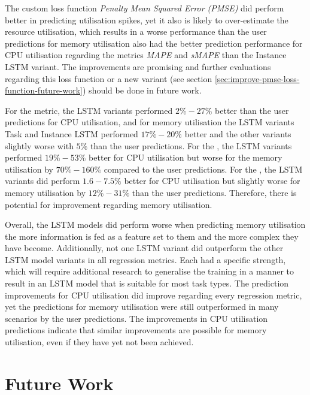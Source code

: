         The custom loss function \emph{Penalty Mean Squared Error (PMSE)} did perform better in predicting utilisation spikes, yet it also is likely to over-estimate the resource utilisation, which results in a worse performance than the user predictions for memory utilisation also had the better prediction performance for CPU utilisation regarding the metrics \emph{MAPE} and \emph{sMAPE} than the Instance LSTM variant.
        The improvements are promising and further evaluations regarding this loss function or a new variant (see section \ref{sec:improve-pmse-loss-function-future-work}) should be done in future work.

        For the  metric, the LSTM variants performed $2\%-27\%$ better than the user predictions for CPU utilisation, and for memory utilisation the LSTM variants Task and Instance LSTM performed $17\%-20\%$ better and the other variants slightly worse with $5\%$ than the user predictions.
        For the , the LSTM variants performed $19\%-53\%$ better for CPU utilisation but worse for the memory utilisation by $70\%-160\%$ compared to the user predictions.
        For the , the LSTM variants did perform $1.6-7.5\%$ better for CPU utilisation but slightly worse for memory utilisation by $12\%-31\%$ than the user predictions.
        Therefore, there is potential for improvement regarding memory utilisation.

        Overall, the LSTM models did perform worse when predicting memory utilisation the more information is fed as a feature set to them and the more complex they have become.
        Additionally, not one LSTM variant did outperform the other LSTM model variants in all regression metrics.
        Each had a specific strength, which will require additional research to generalise the training in a manner to result in an LSTM model that is suitable for most task types. 
        The prediction improvements for CPU utilisation did improve regarding every regression metric, yet the predictions for memory utilisation were still outperformed in many scenarios by the user predictions. 
        The improvements in CPU utilisation predictions indicate that similar improvements are possible for memory utilisation, even if they have yet not been achieved.



    \section{Future Work}
    \label{sec:future-work}

